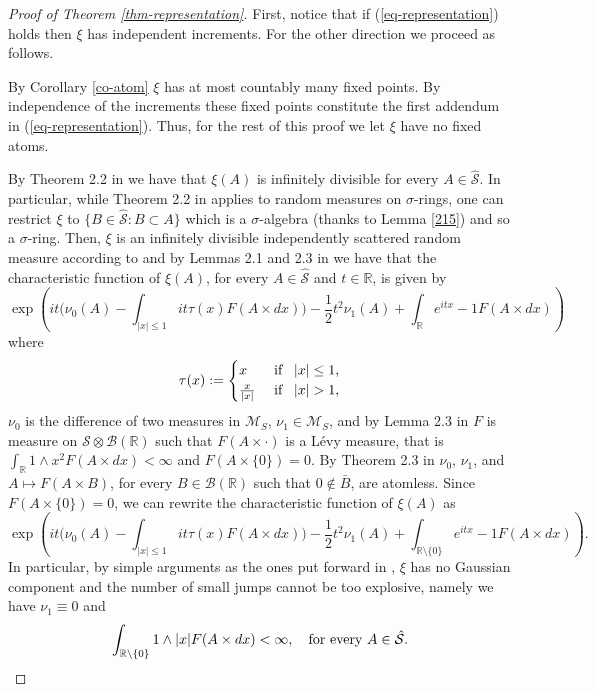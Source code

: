 \documentclass{article}
\theoremstyle{plain}
\theoremstyle{remark}
\begin{document}
\begin{proof}[Proof of Theorem \ref{thm-representation}]
	First, notice that if (\ref{eq-representation}) holds then $\xi$ has independent increments. For the other direction we proceed as follows.
	
	By Corollary \ref{co-atom} $\xi$ has at most countably many fixed points. By independence of the increments these fixed points constitute the first addendum in (\ref{eq-representation}). Thus, for the rest of this proof we let $\xi$ have no fixed atoms. 
	
	By Theorem 2.2 in \cite{PrekopaIII} we have that $\xi(A)$ is infinitely divisible for every $A\in\hat{\mathcal{S}}$. In particular, while Theorem 2.2 in \cite{PrekopaIII} applies to random measures on $\sigma$-rings, one can restrict $\xi$ to $\{B\in\hat{\mathcal{S}}:B\subset A\}$ which is a $\sigma$-algebra (thanks to Lemma \ref{215}) and so a $\sigma$-ring. Then, $\xi$ is an infinitely divisible independently scattered random measure according to \cite{RajRos} and by Lemmas 2.1 and 2.3 in \cite{RajRos} we have that the characteristic function of $\xi(A)$, for every $A\in\hat{\mathcal{S}}$ and $t\in\mathbb{R}$, is given by
	\begin{equation*}
		\exp\left(it\bigg(\nu_0(A)-\int_{|x|\leq 1}it\tau(x) F(A\times dx)\bigg)-\frac{1}{2}t^2\nu_1(A)+\int_{\mathbb{R}}e^{itx}-1 F(A\times dx)\right)
	\end{equation*}
	where 
	\begin{equation*}
		\tau(x):=\begin{cases}
			x\,\,&\textnormal{if }\,\,\,|x|\leq 1,\\ \frac{x}{|x|} \,\,&\textnormal{if }\,\,\,|x|> 1,
		\end{cases}
	\end{equation*}
	$\nu_0$ is the difference of two measures in $\mathcal{M}_S$, $\nu_1\in\mathcal{M}_S$, and by Lemma 2.3 in \cite{RajRos} $F$ is measure on $\mathcal{S}\otimes\mathcal{B} (\mathbb{R})$ such that $F(A\times \cdot)$ is a L\'{e}vy measure, that is $\int_{\mathbb{R}}1\wedge x^2 F(A\times dx)<\infty$ and $F(A\times \{ 0\})=0$. By Theorem 2.3 in \cite{PrekopaIII} $\nu_0$, $\nu_1$, and $A\mapsto F(A\times B)$, for every $B\in \mathcal{B} (\mathbb{R})$ such that $0\notin\bar{B}$, are atomless. Since $F(A\times \{ 0\})=0$, we can rewrite the characteristic function of $\xi(A)$ as
	\begin{equation*}
		\exp\left(it\bigg(\nu_0(A)-\int_{|x|\leq 1}it\tau(x) F(A\times dx)\bigg)-\frac{1}{2}t^2\nu_1(A)+\int_{\mathbb{R}\setminus\{0\}}e^{itx}-1 F(A\times dx)\right).
	\end{equation*}
	In particular, by simple arguments as the ones put forward in \cite{HELLMUND}, $\xi$ has no Gaussian component and the number of small jumps cannot be too explosive, namely we have $\nu_1\equiv 0$ and
	\begin{equation*}
		\int_{\mathbb{R}\setminus\{0\}}1\wedge|x| F(A\times dx)<\infty,\quad\textnormal{for every $A\in\hat{\mathcal{S}}$.}
	\end{equation*}
	

\end{proof}
\end{document}
